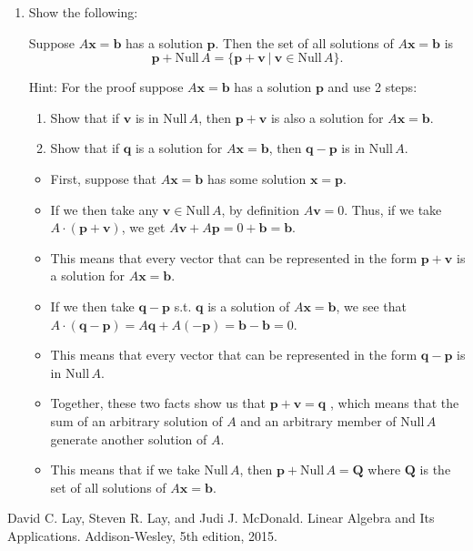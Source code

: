 \documentclass[12pt,a4paper]{exam}
\newcommand{\bb}{\mathbf{b}}
\newcommand{\bp}{\mathbf{p}}
\newcommand{\bq}{\mathbf{q}}
\newcommand{\bv}{\mathbf{v}}
\newcommand{\bx}{\mathbf{x}}
\newcommand{\Nul}{\mathrm{Null\,}}
\begin{document}
\begin{enumerate}
\begin{solution}
\begin{enumerate}
  \end{enumerate}
\end{solution}



\item
Show the following:

\bigskip

 Suppose $A\bx=\bb$ has a solution $\mathbf{p}$. Then the set of all solutions of $A\bx=\bb$ is
\[ \mathbf{p}+\Nul A = \{\mathbf{p}+\mathbf{v}\ |\ \mathbf{v} \in \Nul A\}. \]

\bigskip

\noindent Hint: For the proof suppose $A\bx=\bb$ has a solution $\bp$ and use 2 steps:
\begin{enumerate}
\item Show that if $\bv$ is in $\Nul A$, then $\bp+\bv$ is also a solution for $A\bx=\bb$.
\item Show that if $\bq$ is a solution for $A\bx=\bb$, then $\mathbf{q}-\bp$ is in $\Nul A$.
\end{enumerate}
\begin{solution}
  \begin{itemize}
    \item First, suppose that $A\bx=\bb$ has some solution $\bx=\bp$.
    \item If we then take any $\bv\in\Nul A$, by definition $A\bv=0$. Thus, if we take $A\cdot(\bp+\bv)$,
          we get $A\bv+A\bp=0+\bb=\bb$. 
    \item This means that every vector that can be represented in the form $\bp+\bv$ is a solution for $A\bx=\bb$.
    \item If we then take $\bq-\bp$ s.t. $\bq$ is a solution of $A\bx=\bb$, we see that $A\cdot(\bq-\bp)=
          A\bq+A(-\bp)=\bb-\bb=0$.
    \item This means that every vector that can be represented in the form $\bq-\bp$ is in $\Nul A$.
    \item Together, these two facts show us that $\bp+\bv=\bq$ , which means that the sum of an arbitrary solution of $A$ and an arbitrary member of $\Nul A$ generate another solution of $A$.
    \item This means that if we take $\Nul A$, then $\bp+\Nul A = \mathbf{Q}$ where $\mathbf{Q}$ is the set of all solutions of $A\bx=\bb$.
  \end{itemize}
\end{solution}
\end{enumerate}




\begin{thebibliography}{1}
 David C. Lay, Steven R. Lay, and Judi J. McDonald.
\newblock Linear Algebra and Its Applications.
\newblock Addison-Wesley, 5th edition, 2015.
\end{thebibliography}
\end{document}
